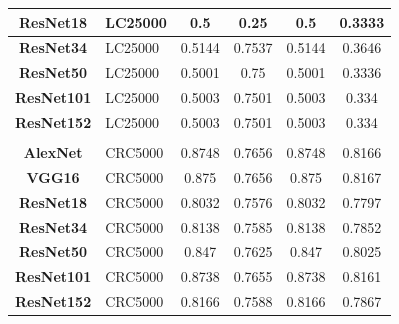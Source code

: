 \begin{table}[t!]
\begin{tabular}{|c|l|c|c|c|c|}
\textbf{ResNet18}      & LC25000                               & 0.5                   & 0.25                  & 0.5                   & 0.3333                \\ \hline
\textbf{ResNet34}      & LC25000                               & 0.5144                & 0.7537                & 0.5144                & 0.3646                \\ \hline
\textbf{ResNet50}      & LC25000                               & 0.5001                & 0.75                  & 0.5001                & 0.3336                \\ \hline
\textbf{ResNet101}     & LC25000                               & 0.5003                & 0.7501                & 0.5003                & 0.334                 \\ \hline
\textbf{ResNet152}     & LC25000                               & 0.5003                & 0.7501                & 0.5003                & 0.334                 \\ \hline
\multicolumn{1}{|l|}{} &                                       & \multicolumn{1}{l|}{} & \multicolumn{1}{l|}{} & \multicolumn{1}{l|}{} & \multicolumn{1}{l|}{} \\ \hline
\textbf{AlexNet}       & CRC5000                               & 0.8748                & 0.7656                & 0.8748                & 0.8166                \\ \hline
\textbf{VGG16}         & CRC5000                               & 0.875                 & 0.7656                & 0.875                 & 0.8167                \\ \hline
\textbf{ResNet18}      & CRC5000                               & 0.8032                & 0.7576                & 0.8032                & 0.7797                \\ \hline
\textbf{ResNet34}      & CRC5000                               & 0.8138                & 0.7585                & 0.8138                & 0.7852                \\ \hline
\textbf{ResNet50}      & CRC5000                               & 0.847                 & 0.7625                & 0.847                 & 0.8025                \\ \hline
\textbf{ResNet101}     & CRC5000                               & 0.8738                & 0.7655                & 0.8738                & 0.8161                \\ \hline
\textbf{ResNet152}     & CRC5000                               & 0.8166                & 0.7588                & 0.8166                & 0.7867                \\ \hline
\end{tabular}

\end{table}


